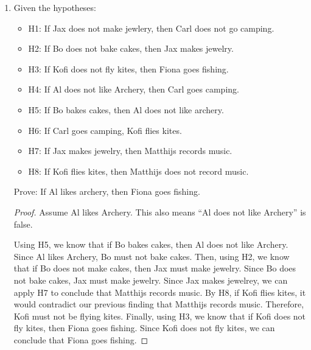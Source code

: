 \documentclass{article}
\begin{document}
\begin{enumerate}
    \item Given the hypotheses:
          \begin{itemize}
              \item H1: If Jax does not make jewlery, then Carl does not go camping. 
              \item H2: If Bo does not bake cakes, then Jax makes jewelry. 
              \item H3: If Kofi does not fly kites, then Fiona goes fishing. 
              \item H4: If Al does not like Archery, then Carl goes camping. 
              \item H5: If Bo bakes cakes, then Al does not like archery. 
              \item H6: If Carl goes camping, Kofi flies kites. 
              \item H7: If Jax makes jewelry, then Matthijs records music. 
              \item H8: If Kofi flies kites, then Matthijs does not record music. 
          \end{itemize}
          Prove: If Al likes archery, then Fiona goes fishing.

          \begin{proof}
              Assume Al likes Archery. This also means ``Al does not like Archery'' is false.

              Using H5, we know that if Bo bakes cakes, then Al does not like Archery. Since
              Al likes Archery, Bo must not bake cakes.
              Then, using H2, we know that if Bo does not make cakes, then Jax must make
              jewelry. Since Bo does not bake cakes, Jax must make jewelry.
              Since Jax makes jewelrey, we can apply H7 to conclude that Matthijs records
              music.
              By H8, if Kofi flies kites, it would contradict our previous finding that
              Matthijs records music. Therefore, Kofi must not be flying kites.
              Finally, using H3, we know that if Kofi does not fly kites, then Fiona goes
              fishing. Since Kofi does not fly kites, we can conclude that Fiona goes
              fishing.


\end{proof}
\end{enumerate}
\end{document}
